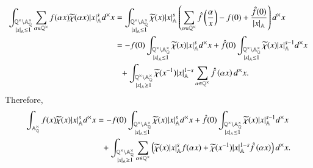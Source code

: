 \documentclass[a4paper, 12pt]{article}
\theoremstyle{Mydefinition}
\theoremstyle{Mytheorem}
\begin{document}
\begin{enumerate}
    \begin{equation}
    \begin{split}
        \int_{\substack{\mathbb{Q}^\times\backslash \mathbb{A}_\mathbb{Q}^\times \\ \abs{x}_\mathbb{A}\leq 1}} \sum_{\alpha\in \mathbb{Q}^\times}f(\alpha x)\widetilde{\chi}(\alpha  x)\abs{x}_{\mathbb{A}}^s d^\times x &=\int_{\substack{\mathbb{Q}^\times\backslash \mathbb{A}_\mathbb{Q}^\times \\ \abs{x}_\mathbb{A}\leq 1}} \widetilde{\chi}(x)\abs{x}_{\mathbb{A}}^s\left(\sum_{\alpha\in \mathbb{Q}^\times}\hat{f}\left(\frac{\alpha}{x}\right) - f(0) + \frac{\hat{f}(0)}{\abs{x}_\mathbb{A}}\right) d^\times x\\
        &=-f(0)\int_{\substack{\mathbb{Q}^\times\backslash \mathbb{A}_\mathbb{Q}^\times \\ \abs{x}_\mathbb{A}\leq 1}} \widetilde{\chi}(x)\abs{x}_{\mathbb{A}}^s d^\times x + \hat{f}(0)\int_{\substack{\mathbb{Q}^\times\backslash \mathbb{A}_\mathbb{Q}^\times \\ \abs{x}_\mathbb{A}\leq 1}} \widetilde{\chi}(x)\abs{x}_{\mathbb{A}}^{s-1} d^\times x\\
        &\phantom{=}+\int_{\substack{\mathbb{Q}^\times\backslash \mathbb{A}_\mathbb{Q}^\times \\ \abs{x}_\mathbb{A}\geq 1}} \widetilde{\chi}(x^{-1})\abs{x}_{\mathbb{A}}^{1-s}\sum_{\alpha\in \mathbb{Q}^\times}\hat{f}\left(\alpha x\right)d^\times x.
    \end{split}
    \end{equation}
    Therefore,
    \begin{equation}
        \begin{split}
        \int_{\mathbb{A}_\mathbb{Q}^\times} f(x)\widetilde{\chi}(x)\abs{x}_{\mathbb{A}}^s d^\times x &= -f(0)\int_{\substack{\mathbb{Q}^\times\backslash \mathbb{A}_\mathbb{Q}^\times \\ \abs{x}_\mathbb{A}\leq 1}} \widetilde{\chi}(x)\abs{x}_{\mathbb{A}}^s d^\times x + \hat{f}(0)\int_{\substack{\mathbb{Q}^\times\backslash \mathbb{A}_\mathbb{Q}^\times \\ \abs{x}_\mathbb{A}\leq 1}} \widetilde{\chi}(x)\abs{x}_{\mathbb{A}}^{s-1} d^\times x\\
        &\phantom{=}+\int_{\substack{\mathbb{Q}^\times\backslash \mathbb{A}_\mathbb{Q}^\times \\ \abs{x}_\mathbb{A}\geq 1}}\sum_{\alpha\in \mathbb{Q}^\times}\left(\widetilde{\chi}(x)\abs{x}_{\mathbb{A}}^sf(\alpha x) + \widetilde{\chi}(x^{-1})\abs{x}_{\mathbb{A}}^{1-s}\hat{f}\left(\alpha x\right)\right)d^\times x.
        \end{split}
    \end{equation}
    

\end{enumerate}
\end{document}
